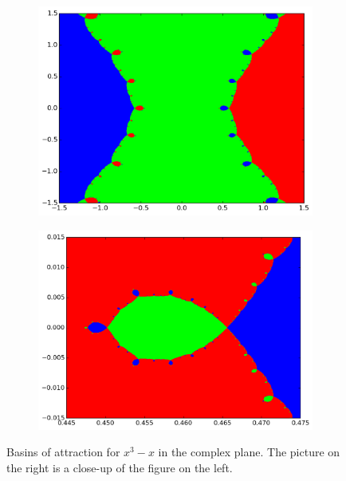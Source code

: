 \begin{figure}
\begin{center}
\begin{subfigure}[b]{.49\textwidth}
\centering
\includegraphics[width=\textwidth]{figures/fractal_ex}
\end{subfigure}
\begin{subfigure}[b]{.49\textwidth}
\centering
\includegraphics[width=\textwidth]{figures/fractal_zoom}
\end{subfigure}
\caption{ Basins of attraction for $x^3-x$ in the complex plane.
The picture on the right is a close-up of the figure on the left.}
\label{fig:fractal_ex}
\end{center}
\end{figure}

